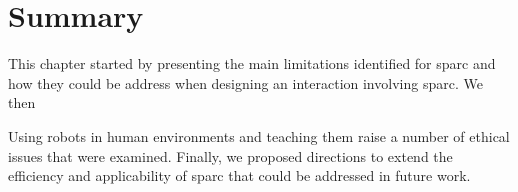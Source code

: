 
\section{Summary} \label{sec:disc_summary}


This chapter started by presenting the main limitations identified for \gls{sparc} and how they could be address when designing an interaction involving \gls{sparc}. We then 

Using robots in human environments and teaching them raise a number of ethical issues that were examined. Finally, we proposed directions to extend the efficiency and applicability of \gls{sparc} that could be addressed in future work.

